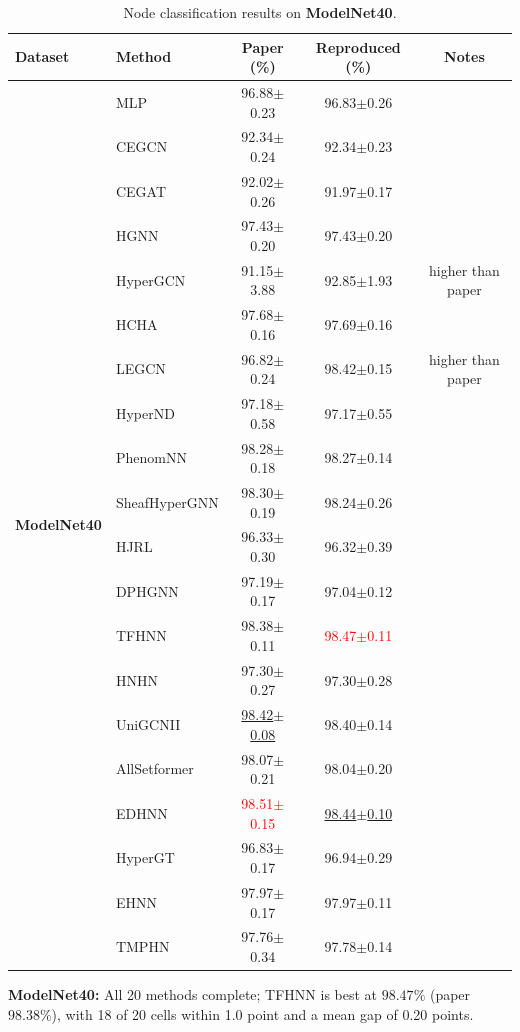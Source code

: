 \documentclass[11pt,a4paper]{article}
\begin{document}
\begin{table}[H]
	\centering\small
	\begin{tabular}{llccc}
		\toprule
		Dataset & Method & Paper (\%) & Reproduced (\%) & Notes \\
		\midrule
		\multirow{20}{*}{\textbf{ModelNet40}} & MLP               & 96.88$\pm$0.23   & 96.83$\pm$0.26   &  \\
		 & CEGCN             & 92.34$\pm$0.24   & 92.34$\pm$0.23   &  \\
		 & CEGAT             & 92.02$\pm$0.26   & 91.97$\pm$0.17   &  \\
		 & HGNN              & 97.43$\pm$0.20   & 97.43$\pm$0.20   &  \\
		 & HyperGCN          & 91.15$\pm$3.88   & 92.85$\pm$1.93   & higher than paper \\
		 & HCHA              & 97.68$\pm$0.16   & 97.69$\pm$0.16   &  \\
		 & LEGCN             & 96.82$\pm$0.24   & 98.42$\pm$0.15   & higher than paper \\
		 & HyperND           & 97.18$\pm$0.58   & 97.17$\pm$0.55   &  \\
		 & PhenomNN          & 98.28$\pm$0.18   & 98.27$\pm$0.14   &  \\
		 & SheafHyperGNN     & 98.30$\pm$0.19   & 98.24$\pm$0.26   &  \\
		 & HJRL              & 96.33$\pm$0.30   & 96.32$\pm$0.39   &  \\
		 & DPHGNN            & 97.19$\pm$0.17   & 97.04$\pm$0.12   &  \\
		 & TFHNN             & 98.38$\pm$0.11   & \textcolor{red}{98.47$\pm$0.11}   &  \\
		 & HNHN              & 97.30$\pm$0.27   & 97.30$\pm$0.28   &  \\
		 & UniGCNII          & \underline{98.42$\pm$0.08}   & 98.40$\pm$0.14   &  \\
		 & AllSetformer      & 98.07$\pm$0.21   & 98.04$\pm$0.20   &  \\
		 & EDHNN             & \textcolor{red}{98.51$\pm$0.15}   & \underline{98.44$\pm$0.10}   &  \\
		 & HyperGT           & 96.83$\pm$0.17   & 96.94$\pm$0.29   &  \\
		 & EHNN              & 97.97$\pm$0.17   & 97.97$\pm$0.11   &  \\
		 & TMPHN             & 97.76$\pm$0.34   & 97.78$\pm$0.14   &  \\
		\bottomrule
	\end{tabular}
	\caption{Node classification results on \textbf{ModelNet40}.}
\end{table}
\par\smallskip
\noindent\textbf{ModelNet40:} All 20 methods complete; TFHNN is best at $98.47\%$ (paper $98.38\%$), with 18 of 20 cells within 1.0 point and a mean gap of 0.20 points.
\end{document}
